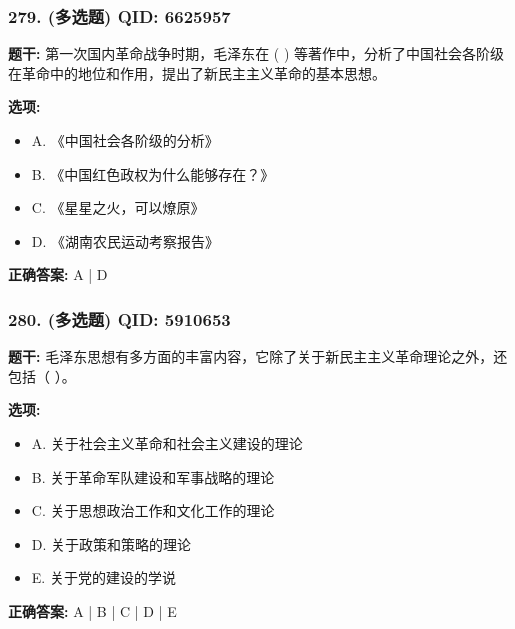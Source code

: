\documentclass[12pt,UTF8]{ctexart}
\begin{document}
\subsubsection*{279. (多选题) \small QID: 6625957}

\textbf{题干:}
第一次国内革命战争时期，毛泽东在 ( ) 等著作中，分析了中国社会各阶级在革命中的地位和作用，提出了新民主主义革命的基本思想。

\textbf{选项:}
\begin{itemize}[leftmargin=*]

  \item A. 《中国社会各阶级的分析》

  \item B. 《中国红色政权为什么能够存在？》

  \item C. 《星星之火，可以燎原》

  \item D. 《湖南农民运动考察报告》

\end{itemize}

\textbf{正确答案:}
A | D

\vspace{0.3em}\hrulefill\vspace{0.7em}

\subsubsection*{280. (多选题) \small QID: 5910653}

\textbf{题干:}
毛泽东思想有多方面的丰富内容，它除了关于新民主主义革命理论之外，还包括（ ）。

\textbf{选项:}
\begin{itemize}[leftmargin=*]

  \item A. 关于社会主义革命和社会主义建设的理论

  \item B. 关于革命军队建设和军事战略的理论

  \item C. 关于思想政治工作和文化工作的理论

  \item D. 关于政策和策略的理论

  \item E. 关于党的建设的学说

\end{itemize}

\textbf{正确答案:}
A | B | C | D | E
\end{document}
